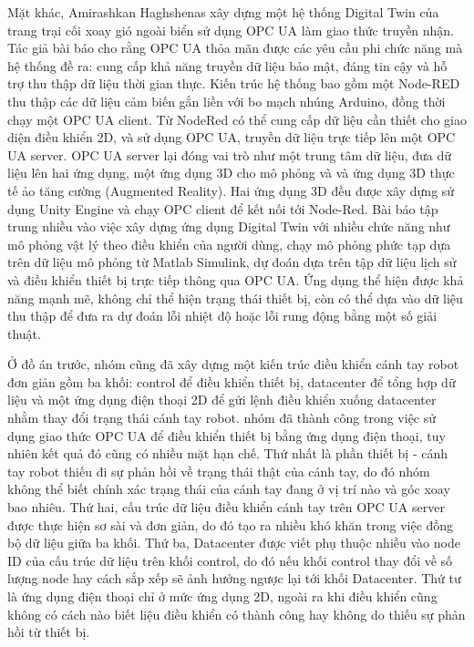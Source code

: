Mặt khác, Amirashkan Haghshenas \cite{haghshenaspredictivewindstore} xây dựng một hệ thống Digital Twin của trang trại cối xoay gió ngoài biển sử dụng OPC UA làm giao thức truyền nhận. Tác giả bài báo cho rằng OPC UA thỏa mãn được các yêu cầu phi chức năng mà hệ thống đề ra: cung cấp khả năng truyền dữ liệu bảo mật, đáng tin cậy và hỗ trợ thu thập dữ liệu thời gian thực. Kiến trúc hệ thống bao gồm một Node-RED thu thập các dữ liệu cảm biến gắn liền với bo mạch nhúng Arduino, đồng thời chạy một OPC UA client. Từ NodeRed có thể cung cấp dữ liệu cần thiết cho giao diện điều khiển 2D, và sử dụng OPC UA, truyền dữ liệu trực tiếp lên một OPC UA server. OPC UA server lại đóng vai trò như một trung tâm dữ liệu, đưa dữ liệu lên hai ứng dụng, một ứng dụng 3D cho mô phỏng và và ứng dụng 3D thực tế ảo tăng cường (Augmented Reality). Hai ứng dụng 3D đều được xây dựng sử dụng Unity Engine và chạy OPC client để kết nối tới Node-Red. Bài báo tập trung nhiều vào việc xây dựng ứng dụng Digital Twin với nhiều chức năng như mô phỏng vật lý theo điều khiển của người dùng, chạy mô phỏng phức tạp dựa trên dữ liệu mô phỏng từ Matlab Simulink, dự đoán dựa trên tập dữ liệu lịch sử và điều khiển thiết bị trực tiếp thông qua OPC UA. Ứng dụng thể hiện được khả năng mạnh mẽ, không chỉ thể hiện trạng thái thiết bị, còn có thể dựa vào dữ liệu thu thập để đưa ra dự đoán lỗi nhiệt độ hoặc lỗi rung động bằng một số giải thuật.

Ở đồ án trước, nhóm cũng đã xây dựng một kiến trúc điều khiển cánh tay robot đơn giản gồm ba khối: control để điều khiển thiết bị, datacenter để tổng hợp dữ liệu và một ứng dụng điện thoại 2D để gửi lệnh điều khiển xuống datacenter nhằm thay đổi trạng thái cánh tay robot. nhóm đã thành công trong việc sử dụng giao thức OPC UA để điều khiển thiết bị bằng ứng dụng điện thoại, tuy nhiên kết quả đó cũng có nhiều mặt hạn chế. Thứ nhất là phần thiết bị - cánh tay robot thiếu đi sự phản hồi về trạng thái thật của cánh tay, do đó nhóm không thể biết chính xác trạng thái của cánh tay đang ở vị trí nào và góc xoay bao nhiêu. Thứ hai, cấu trúc dữ liệu điều khiển cánh tay trên OPC UA server được thực hiện sơ sài và đơn giản, do đó tạo ra nhiều khó khăn trong việc đồng bộ dữ liệu giữa ba khối. Thứ ba, Datacenter được viết phụ thuộc nhiều vào node ID của cấu trúc dữ liệu trên khối control, do đó nếu khối control thay đổi về số lượng node hay cách sắp xếp sẽ ảnh hưởng ngược lại tới khối Datacenter. Thứ tư là ứng dụng điện thoại chỉ ở mức ứng dụng 2D, ngoài ra khi điều khiển cũng không có cách nào biết liệu điều khiển có thành công hay không do thiếu sự phản hồi từ thiết bị. 

